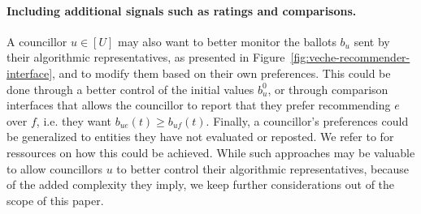 \paragraph{Including additional signals such as ratings and comparisons.}
A councillor $u \in [U]$ may also want 
to better monitor the ballots $b_u$ sent by their algorithmic representatives,
as presented in Figure~\ref{fig:veche-recommender-interface},
and to modify them based on their own preferences.
This could be done through a better control of the initial values $b_u^0$,
or through comparison interfaces that allows the councillor to report
that they prefer recommending $e$ over $f$, i.e. they want $b_{ue} (t) \geq b_{uf} (t)$.
Finally, a councillor's preferences could be generalized to entities they have not evaluated or reposted.
We refer 
to \cite{DBLP:conf/aaai/FageotFHV24,DBLP:journals/corr/abs-2602-08033} 
for ressources on how this could be achieved.
While such approaches may be valuable to allow councillors $u$ 
to better control their algorithmic representatives,
because of the added complexity they imply,
we keep further considerations out of the scope of this paper.

